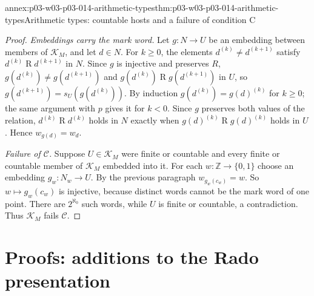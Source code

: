 \begin{annexitem}{annex:p03-w03-p03-014-arithmetic-types}{thm:p03-w03-p03-014-arithmetic-types}{Arithmetic types: countable hosts and a failure of condition C}
\begin{proof}
\emph{Embeddings carry the mark word.} Let \(g:N\to U\) be an embedding
between members of \(\mathcal K_M\), and let \(d\in N\). For \(k\geq0\),
the elements \(d^{(k)}\neq d^{(k+1)}\) satisfy
\(d^{(k)}\mathrel Rd^{(k+1)}\) in \(N\). Since \(g\) is injective and
preserves \(R\), \(g(d^{(k)})\neq g(d^{(k+1)})\) and
\(g(d^{(k)})\mathrel Rg(d^{(k+1)})\) in \(U\), so
\(g(d^{(k+1)})=s_U(g(d^{(k)}))\). By induction
\(g(d^{(k)})=g(d)^{(k)}\) for \(k\geq0\); the same argument with
\(p\) gives it for \(k<0\). Since \(g\) preserves both values of the
relation, \(d^{(k)}\mathrel Rd^{(k)}\) holds in \(N\) exactly when
\(g(d)^{(k)}\mathrel Rg(d)^{(k)}\) holds in \(U\). Hence
\(w_{g(d)}=w_d\).

\emph{Failure of \(\mathcal C\).} Suppose \(U\in\mathcal K_M\) were
finite or countable and every finite or countable member of
\(\mathcal K_M\) embedded into it. For each
\(w:\mathbb Z\to\{0,1\}\) choose an embedding \(g_w:N_w\to U\). By the
previous paragraph \(w_{g_w(c_w)}=w\). So \(w\mapsto g_w(c_w)\) is
injective, because distinct words cannot be the mark word of one point.
There are \(2^{\aleph_0}\) such words, while \(U\) is finite or
countable, a contradiction. Thus \(\mathcal K_M\) fails \(\mathcal C\).
\end{proof}
\end{annexitem}

\section{Proofs: additions to the Rado presentation}
\label{sec:annex-p03-w03-p03-014-rado}

